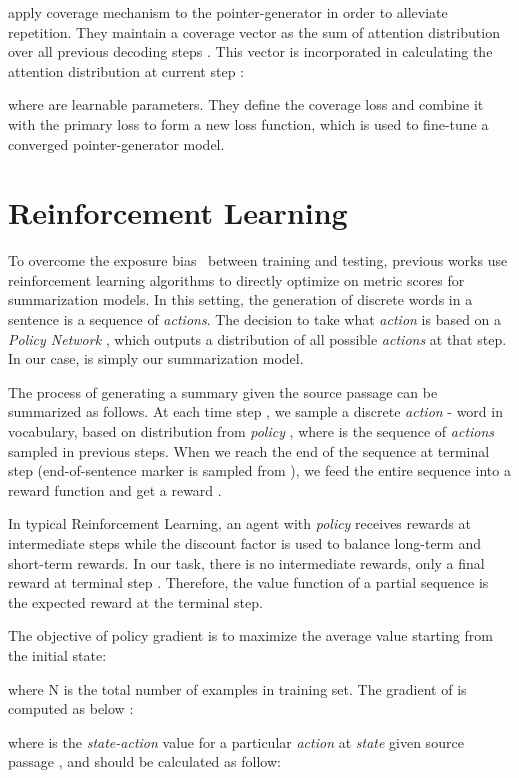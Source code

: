 \documentclass[11pt,a4paper]{article}
\begin{document}
 apply coverage mechanism to the pointer-generator in order to alleviate repetition. They maintain a coverage vector  as the sum of attention distribution over all previous decoding steps . This vector is incorporated in calculating the attention distribution at current step :

where  are learnable parameters. They define the coverage loss and combine it with the primary loss to form a new loss function, which is used to fine-tune a converged pointer-generator model.


\section{Reinforcement Learning}
To overcome the exposure bias~\cite{Bengio:15} between training and testing, previous works \cite{Ranzato:16,Paulus:17} use reinforcement learning algorithms to directly optimize on metric scores for summarization models. In this setting, the generation of discrete words in a sentence is a sequence of \emph{actions}. The decision to take what \emph{action} is based on a \emph{Policy Network} , which outputs a distribution of all possible \emph{actions} at that step. In our case,  is simply our summarization model.

The process of generating a summary  given the source passage  can be summarized as follows. At each time step , we sample a discrete \emph{action}  - word in vocabulary, based on distribution from \emph{policy} , where  is the sequence of \emph{actions} sampled in previous steps. When we reach the end of the sequence at terminal step  (end-of-sentence marker is sampled from ), we feed the entire sequence  into a reward function and get a reward .

In typical Reinforcement Learning, an agent with \emph{policy} receives rewards at intermediate steps while the discount factor is used to balance long-term and short-term rewards. In our task, there is no intermediate rewards, only a final reward at terminal step . Therefore, the value function of a partial sequence  is the expected reward at the terminal step.


The objective of policy gradient is to maximize the average value starting from the initial state:

where N is the total number of examples in training set. The gradient of  is computed as below \cite{Williams:92}:


where  is the \emph{state-action} value for a particular \emph{action}  at \emph{state}  given source passage , and should be calculated as follow:
\end{document}
